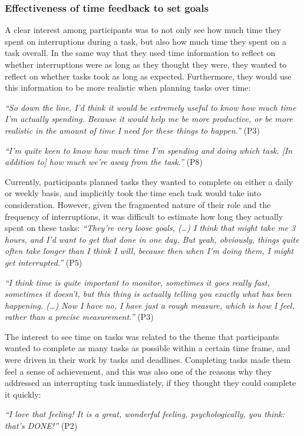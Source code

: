\subsubsection{Effectiveness of time feedback to set goals}
A clear interest among participants was to not only see how much time they spent on interruptions during a task, but also how much time they spent on a task overall. In the same way that they used time information to reflect on whether interruptions were as long as they thought they were, they wanted to reflect on whether tasks took as long as expected. Furthermore, they would use this information to be more realistic when planning tasks over time: 

\textit{“So down the line, I’d think it would be extremely useful to know how much time I’m actually spending. Because it would help me be more productive, or be more realistic in the amount of time I need for these things to happen.”} (P3)

\textit{“I'm quite keen to know how much time I'm spending and doing which task. [In addition to] how much we're away from the task.”} (P8) 

Currently, participants planned tasks they wanted to complete on either a daily or weekly basis, and implicitly took the time each task would take into consideration. However, given the fragmented nature of their role and the frequency of interruptions, it was difficult to estimate how long they actually spent on these tasks: 
\textit{“They’re very loose goals, (…) I think that might take me 3 hours, and I’d want to get that done in one day. But yeah, obviously, things quite often take longer than I think I will, because then when I’m doing them, I might get interrupted.”} (P5)

\textit{“I think time is quite important to monitor, sometimes it goes really fast, sometimes it doesn’t, but this thing is actually telling you exactly what has been happening. (…) Now I have no, I have just a rough measure, which is how I feel, rather than a precise measurement.”} (P3)

The interest to see time on tasks was related to the theme that participants wanted to complete as many tasks as possible within a certain time frame, and were driven in their work by tasks and deadlines. Completing tasks made them feel a sense of achievement, and this was also one of the reasons why they addressed an interrupting task immediately, if they thought they could complete it quickly:

\textit{“I love that feeling! It is a great, wonderful feeling, psychologically, you think: that’s DONE!”} (P2)

